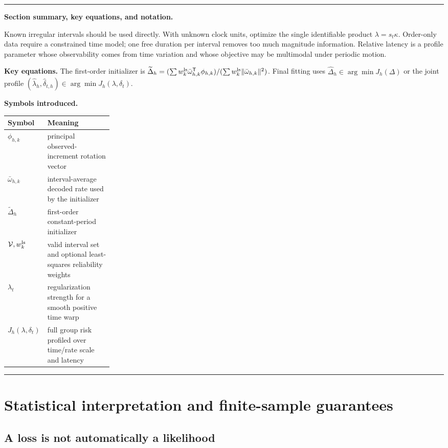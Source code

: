 \documentclass[11pt]{article}
\newenvironment{sectionrecap}
{\par\medskip\begingroup\small\noindent\rule{\linewidth}{0.4pt}\par
\smallskip\noindent\textbf{Section summary, key equations, and notation.}\par\smallskip}
{\par\smallskip\noindent\rule{\linewidth}{0.4pt}\par\endgroup\medskip}
\begin{document}
    \begin{sectionrecap}
        Known irregular intervals should be used directly. With unknown clock units, optimize
        the single identifiable product $\lambda=s_t\kappa$. Order-only data require a constrained
        time model; one free duration per interval removes too much magnitude information.
        Relative latency is a profile parameter whose observability comes from time variation and
        whose objective may be multimodal under periodic motion.

        \noindent\textbf{Key equations.}
        The first-order initializer is
        \(\widetilde\Delta_h=(\sum w_k^{\rm ls}\bar\omega_{h,k}^{\mathsf T}\phi_{h,k})/
        (\sum w_k^{\rm ls}\|\bar\omega_{h,k}\|^2)\). Final fitting uses
        \(\widehat\Delta_h\in\arg\min J_h(\Delta)\) or the joint profile
        \((\widehat\lambda_h,\widehat\delta_{t,h})\in\arg\min J_h(\lambda,\delta_t)\).

        \noindent\textbf{Symbols introduced.}
        \par\noindent\begin{tabularx}{\linewidth}{@{}p{0.24\linewidth}Y@{}}
\toprule
Symbol & Meaning \\
\midrule
$\phi_{h,k}$ & principal observed-increment rotation vector \\
$\bar\omega_{h,k}$ & interval-average decoded rate used by the initializer \\
$\widetilde\Delta_h$ & first-order constant-period initializer \\
$\mathcal V,w_k^{\rm ls}$ & valid interval set and optional least-squares reliability weights \\
$\lambda_t$ & regularization strength for a smooth positive time warp \\
$J_h(\lambda,\delta_t)$ & full group risk profiled over time/rate scale and latency \\
\bottomrule
        \end{tabularx}
    \end{sectionrecap}


    \section{Statistical interpretation and finite-sample guarantees}\label{app:statistics}

    \subsection{A loss is not automatically a likelihood}
\end{document}
